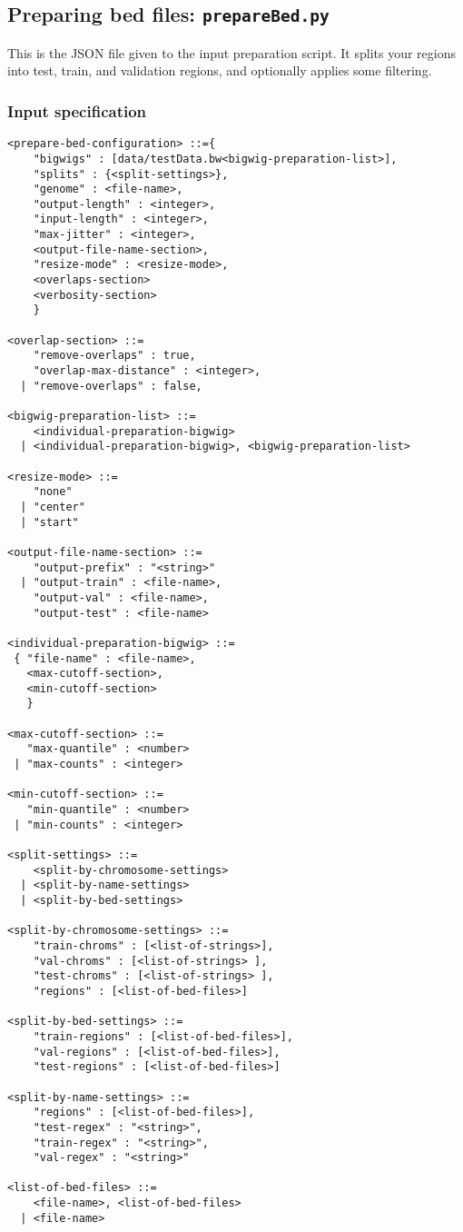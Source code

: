 \documentclass{article}
\begin{document}
\newpage

\subsection{Preparing bed files: \texttt{prepareBed.py}}

This is the JSON file given to the input preparation script. It splits your regions into 
test, train, and validation regions, and optionally applies some filtering. 

\subsubsection{Input specification}

\begin{lstlisting}
<prepare-bed-configuration> ::={
    "bigwigs" : [data/testData.bw<bigwig-preparation-list>],
    "splits" : {<split-settings>},
    "genome" : <file-name>,
    "output-length" : <integer>,
    "input-length" : <integer>,
    "max-jitter" : <integer>,
    <output-file-name-section>,
    "resize-mode" : <resize-mode>,
    <overlaps-section>
    <verbosity-section>
    }

<overlap-section> ::=
    "remove-overlaps" : true,
    "overlap-max-distance" : <integer>,
  | "remove-overlaps" : false,

<bigwig-preparation-list> ::=
    <individual-preparation-bigwig> 
  | <individual-preparation-bigwig>, <bigwig-preparation-list>

<resize-mode> ::= 
    "none"
  | "center"
  | "start"

<output-file-name-section> ::=
    "output-prefix" : "<string>"
  | "output-train" : <file-name>,
    "output-val" : <file-name>,
    "output-test" : <file-name>

<individual-preparation-bigwig> ::=
 { "file-name" : <file-name>,
   <max-cutoff-section>,
   <min-cutoff-section> 
   }

<max-cutoff-section> ::=
   "max-quantile" : <number>
 | "max-counts" : <integer>

<min-cutoff-section> ::=
   "min-quantile" : <number>
 | "min-counts" : <integer>

<split-settings> ::=
    <split-by-chromosome-settings>
  | <split-by-name-settings>
  | <split-by-bed-settings>

<split-by-chromosome-settings> ::=
    "train-chroms" : [<list-of-strings>],
    "val-chroms" : [<list-of-strings> ],
    "test-chroms" : [<list-of-strings> ],
    "regions" : [<list-of-bed-files>]

<split-by-bed-settings> ::=
    "train-regions" : [<list-of-bed-files>],
    "val-regions" : [<list-of-bed-files>],
    "test-regions" : [<list-of-bed-files>]

<split-by-name-settings> ::=
    "regions" : [<list-of-bed-files>],
    "test-regex" : "<string>",
    "train-regex" : "<string>",
    "val-regex" : "<string>"

<list-of-bed-files> ::=
    <file-name>, <list-of-bed-files>
  | <file-name>

\end{lstlisting}
\end{document}
